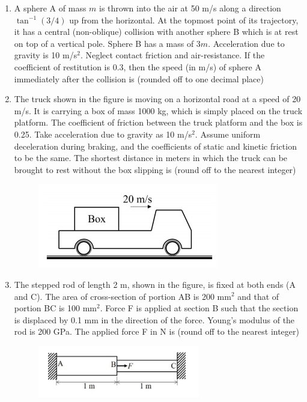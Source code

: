 \documentclass[a4paper,10pt]{article}
\begin{document}
\begin{enumerate}
\hfill{}

\item A sphere A of mass $m$ is thrown into the air at 50 m/s along a direction $\tan^{-1}(3/4)$ up from the horizontal. At the topmost point of its trajectory, it has a central (non-oblique) collision with another sphere B which is at rest on top of a vertical pole. Sphere B has a mass of $3m$. Acceleration due to gravity is 10 m/s$^2$. Neglect contact friction and air-resistance. If the coefficient of restitution is 0.3, then the speed (in m/s) of sphere A immediately after the collision is \underline{\hspace{2cm}} (rounded off to one decimal place)

\hfill{}

\item The truck shown in the figure is moving on a horizontal road at a speed of 20 m/s. It is carrying a box of mass 1000 kg, which is simply placed on the truck platform. The coefficient of friction between the truck platform and the box is 0.25. Take acceleration due to gravity as 10 m/s$^2$. Assume uniform deceleration during braking, and the coefficients of static and kinetic friction to be the same. The shortest distance in meters in which the truck can be brought to rest without the box slipping is \underline{\hspace{2cm}} (round off to the nearest integer)
\begin{figure}[H]
    \centering
    \includegraphics[width=0.6\columnwidth]{q84.png}
    \caption*{}
    \label{fig:q84}
\end{figure}

\hfill{}

\item The stepped rod of length 2 m, shown in the figure, is fixed at both ends (A and C). The area of cross-section of portion AB is 200 mm$^2$ and that of portion BC is 100 mm$^2$. Force F is applied at section B such that the section is displaced by 0.1 mm in the direction of the force. Young's modulus of the rod is 200 GPa. The applied force F in N is \underline{\hspace{2cm}} (round off to the nearest integer)
\begin{figure}[H]
    \centering
    \includegraphics[width=0.6\columnwidth]{q85.png}
    \caption*{}
    \label{fig:q85}
\end{figure}


\end{enumerate}
\end{document}
